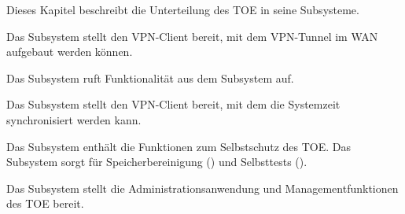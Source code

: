 

Dieses Kapitel beschreibt die Unterteilung des TOE in seine Subsysteme.



Das Subsystem  stellt den VPN-Client bereit, mit dem VPN-Tunnel im
WAN aufgebaut werden können.




Das Subsystem ruft Funktionalität aus dem Subsystem 
auf.



Das Subsystem  stellt den VPN-Client bereit, mit dem die
Systemzeit synchronisiert werden kann.






Das Subsystem  enthält die Funktionen zum Selbstschutz des
TOE. Das Subsystem sorgt für Speicherbereinigung
() und Selbsttests
().






Das Subsystem  stellt die Administrationsanwendung und
Managementfunktionen des TOE bereit.




